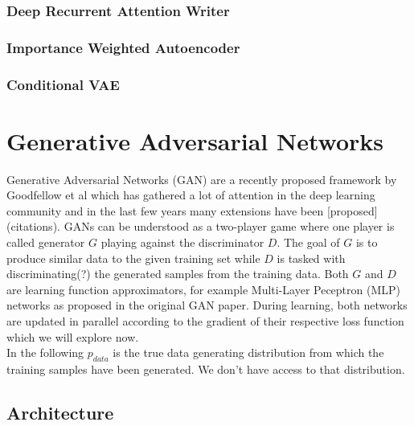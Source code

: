 \documentclass[twoside,11pt,a4paper]{article}
\theoremstyle{break}
\begin{document}
\subsubsection{Deep Recurrent Attention Writer}
\label{ssub:vae_deep_recurrent_attention_writer}

\subsubsection{Importance Weighted Autoencoder}
\label{ssub:vae_importance_weighted_autoencoder}

\subsubsection{Conditional VAE}
\label{ssub:vae_conditional_vae}









\section{Generative Adversarial Networks}
\label{sec:gan}

Generative Adversarial Networks (GAN) are a recently proposed framework by Goodfellow et al which has gathered a lot of attention in the deep learning community and in the last few years many extensions have been [proposed] (citations).
GANs can be understood as a two-player game where one player is called generator $G$ playing against the discriminator $D$.
The goal of $G$ is to produce similar data to the given training set while $D$ is tasked with discriminating(?) the generated samples from the training data. Both $G$ and $D$ are learning function approximators, for example Multi-Layer Peceptron (MLP) networks as proposed in the original GAN paper.
During learning, both networks are updated in parallel according to the gradient of their respective loss function which we will explore now.\\
In the following $p_{data}$ is the true data generating distribution from which the training samples have been generated.
We don't have access to that distribution.

\subsection{Architecture}
\label{sub:gan_arch}
\end{document}
